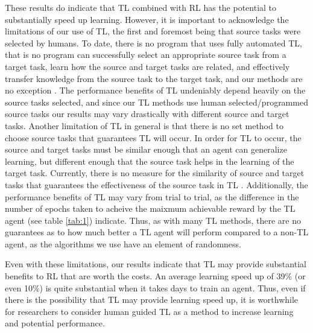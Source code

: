 \documentclass{llncs}
\begin{document}
These results do indicate that TL combined with RL has the potential to substantially speed up learning. 
However, it is important to acknowledge the limitations of our use of TL, the first and foremost being that source tasks were selected by humans. 
To date, there is no program that uses fully automated TL, that is no program can successfully select an appropriate source task from a target task, learn how the source and target tasks are related, and effectively transfer knowledge from the source task to the target task, and our methods are no exception \citep{taylor2009transfer}. 
The performance benefits of TL undeniably depend heavily on the source tasks selected, and since our TL methods use human selected/programmed source tasks our results may vary drastically with different source and target tasks. 
Another limitation of TL in general is that there is no set method to choose source tasks that guarantees TL will occur.
In order for TL to occur, the source and target tasks must be similar enough that an agent can generalize learning, but different enough that the source task helps in the learning of the target task.
Currently, there is no measure for the similarity of source and target tasks that guarantees the effectiveness of the source task in TL \citep{taylor2009transfer}.
Additionally, the performance benefits of TL may vary from trial to trial, as the difference in the number of epochs taken to acheive the maixmum achievable reward by the TL agent (see table \ref{tab:1}) indicate. 
Thus, as with many TL methods, there are no guarantees as to how much better a TL agent will perform compared to a non-TL agent, as the algorithms we use have an element of randomness. 

Even with these limitations, our results indicate that TL may provide substantial benefits to RL that are worth the costs.
An average learning speed up of 39\% (or even 10\%) is quite substantial when it takes days to train an agent. 
Thus, even if there is the possibility that TL may provide learning speed up, it is worthwhile for researchers to consider human guided TL as a method to increase learning and potential performance. 


\end{document}
